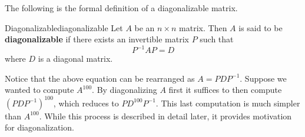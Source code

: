 The following is the formal definition of a diagonalizable matrix. 

\begin{definition}{Diagonalizable}{diagonalizable}
Let $A$ be an $n\times n$ matrix. Then $A$ is said to be \textbf{diagonalizable} if there exists an invertible matrix $P$ such that
\begin{equation*}
P^{-1}AP=D
\end{equation*}
where $D$ is a diagonal matrix.
\end{definition}

Notice that the above equation can be rearranged as $A=PDP^{-1}$. Suppose we wanted to compute $A^{100}$. By diagonalizing $A$ first it suffices to then compute $\left(PDP^{-1}\right)^{100}$, which reduces to $PD^{100}P^{-1}$. This last computation is much simpler than $A^{100}$. While this process is described in detail later, it provides motivation for diagonalization. 

